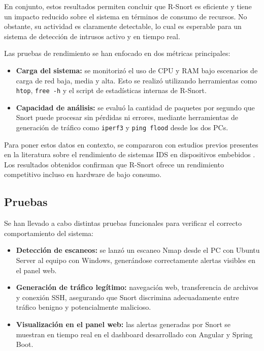 \documentclass[11pt,a4paper,twoside]{report}
\begin{document}
\pagebreak

En conjunto, estos resultados permiten concluir que R-Snort es eficiente y tiene un impacto reducido sobre el sistema en términos de consumo de recursos. No obstante, su actividad es claramente detectable, lo cual es esperable para un sistema de detección de intrusos activo y en tiempo real.\newline

Las pruebas de rendimiento se han enfocado en dos métricas principales:

\begin{itemize}
	\item \textbf{Carga del sistema:} se monitorizó el uso de CPU y RAM bajo escenarios de carga de red baja, media y alta. Esto se realizó utilizando herramientas como \texttt{htop}, \texttt{free -h} y el script de estadísticas internas de R-Snort.
	\item \textbf{Capacidad de análisis:} se evaluó la cantidad de paquetes por segundo que Snort puede procesar sin pérdidas ni errores, mediante herramientas de generación de tráfico como \texttt{iperf3} y \texttt{ping flood} desde los dos PCs.
\end{itemize}

Para poner estos datos en contexto, se compararon con estudios previos presentes en la literatura sobre el rendimiento de sistemas IDS en dispositivos embebidos \cite{delacruz2020ids}. Los resultados obtenidos confirman que R-Snort ofrece un rendimiento competitivo incluso en hardware de bajo consumo.


\subsection{Pruebas}

Se han llevado a cabo distintas pruebas funcionales para verificar el correcto comportamiento del sistema:

\begin{itemize}
	\item \textbf{Detección de escaneos:} se lanzó un escaneo Nmap desde el PC con Ubuntu Server al equipo con Windows, generándose correctamente alertas visibles en el panel web.
	\item \textbf{Generación de tráfico legítimo:} navegación web, transferencia de archivos y conexión SSH, asegurando que Snort discrimina adecuadamente entre tráfico benigno y potencialmente malicioso.
	\item \textbf{Visualización en el panel web:} las alertas generadas por Snort se muestran en tiempo real en el dashboard desarrollado con Angular y Spring Boot.
\end{itemize}
\end{document}
